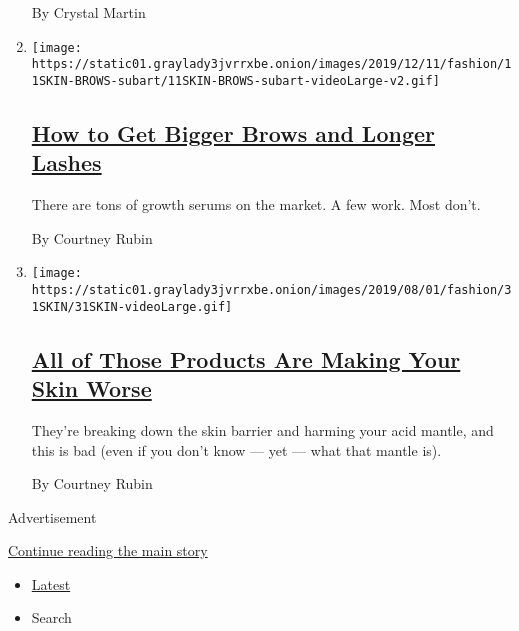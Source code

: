 \begin{enumerate}
  By Crystal Martin
\item
  \texttt{[image: https://static01.graylady3jvrrxbe.onion/images/2019/12/11/fashion/11SKIN-BROWS-subart/11SKIN-BROWS-subart-videoLarge-v2.gif]}

  \hypertarget{how-to-get-bigger-brows-and-longer-lashes}{%
  \subsection{\texorpdfstring{\href{/2019/12/12/style/how-to-get-bigger-brows-and-longer-lashes.html}{How
  to Get Bigger Brows and Longer
  Lashes}}{How to Get Bigger Brows and Longer Lashes}}\label{how-to-get-bigger-brows-and-longer-lashes}}

  There are tons of growth serums on the market. A few work. Most don't.

  By Courtney Rubin
\item
  \texttt{[image: https://static01.graylady3jvrrxbe.onion/images/2019/08/01/fashion/31SKIN/31SKIN-videoLarge.gif]}

  \hypertarget{all-of-those-products-are-making-your-skin-worse}{%
  \subsection{\texorpdfstring{\href{/2019/07/30/style/all-of-those-products-are-making-your-skin-worse.html}{All
  of Those Products Are Making Your Skin
  Worse}}{All of Those Products Are Making Your Skin Worse}}\label{all-of-those-products-are-making-your-skin-worse}}

  They're breaking down the skin barrier and harming your acid mantle,
  and this is bad (even if you don't know --- yet --- what that mantle
  is).

  By Courtney Rubin
\end{enumerate}

Advertisement

\protect\hyperlink{after-mid1}{Continue reading the main story}

\begin{itemize}
\tightlist
\item
  \protect\hyperlink{stream-panel}{Latest}
\item
  Search
\end{itemize}

